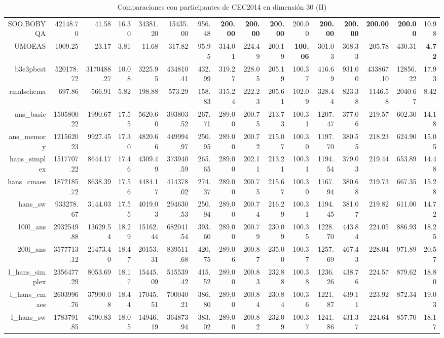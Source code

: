 \begin{table}[h!]
\begin{tabular}{rrrrrrrrrrrrrrrr}
  SOO.BOBYQA & 42148.70 & 41.58 & 16.30 & 34381.20 & 15435.00 & 956.48 & \textbf{200.00} & \textbf{200.00} & \textbf{200.00} & 200.00 & \textbf{200.00} & \textbf{200.00} & \textbf{200.00} & \textbf{200.00} & 10.98 \\ 
  UMOEAS & 1009.25 & 23.17 & 3.81 & 11.68 & 317.82 & 95.95 & 314.01 & 224.49 & 200.19 & \textbf{100.06} & 301.03 & 368.33 & 205.78 & 430.31 & \textbf{4.72} \\ 
  b3e3pbest & 520178.72 & 3170488.27 & 10.08 & 3225.95 & 434810.41 & 432.99 & 319.27 & 228.05 & 205.19 & 100.37 & 416.69 & 931.00 & 433867.10 & 12856.22 & 17.93 \\ 
  rmalschcma & 697.86 & 566.91 & 5.82 & 198.88 & 573.29 & 158.83 & 315.24 & 222.23 & 205.61 & 102.09 & 328.44 & 823.38 & 1146.58 & 2040.67 & 8.42 \\ 
  ans\_basic & 1505800.22 & 1990.67 & 17.55 & 5620.60 & 393803.52 & 267.71 & 289.00 & 200.75 & 213.73 & 100.31 & 1207.47 & 377.06 & 219.57 & 602.30 & 14.18 \\ 
  ans\_memory & 1215620.23 & 9927.45 & 17.30 & 4820.66 & 449994.97 & 250.95 & 289.00 & 200.72 & 215.07 & 100.30 & 1197.70 & 380.55 & 218.23 & 624.90 & 15.05 \\ 
  hans\_simplex & 1517707.22 & 8644.17 & 17.46 & 4309.49 & 373940.59 & 265.65 & 289.00 & 202.11 & 213.21 & 100.31 & 1194.54 & 379.03 & 219.44 & 653.89 & 14.48 \\ 
  hans\_cmaes & 1872185.72 & 8638.39 & 17.56 & 4484.17 & 414378.02 & 274.37 & 289.00 & 200.75 & 215.67 & 100.30 & 1167.94 & 380.68 & 219.73 & 667.35 & 15.28 \\ 
  hans\_sw & 933278.67 & 3144.03 & 17.55 & 4019.03 & 294630.53 & 250.94 & 289.00 & 200.74 & 216.29 & 100.31 & 1194.45 & 381.07 & 219.82 & 611.00 & 14.72 \\ 
  100l\_ans & 2932549.88 & 13629.54 & 18.29 & 15162.44 & 682041.54 & 393.60 & 289.00 & 200.79 & 230.09 & 100.35 & 1228.70 & 443.84 & 224.05 & 886.93 & 18.25 \\ 
  200l\_ans & 3577713.12 & 21473.40 & 18.47 & 20153.31 & 839511.68 & 420.75 & 289.06 & 200.87 & 235.00 & 100.37 & 1257.69 & 467.43 & 228.04 & 971.89 & 20.57 \\ 
  l\_hans\_simplex & 2356477.29 & 8053.69 & 18.17 & 15445.09 & 515539.42 & 415.52 & 289.00 & 200.83 & 232.88 & 100.38 & 1236.26 & 438.76 & 224.57 & 879.62 & 18.80 \\ 
  l\_hans\_cmaes & 2603996.76 & 37990.08 & 18.44 & 17045.51 & 700040.21 & 386.80 & 289.00 & 200.84 & 230.84 & 100.36 & 1221.87 & 439.11 & 223.92 & 872.34 & 19.03 \\ 
  l\_hans\_sw & 1783791.85 & 4590.83 & 18.05 & 14946.19 & 364873.94 & 383.02 & 289.00 & 200.82 & 232.09 & 100.37 & 1241.86 & 431.37 & 224.64 & 857.70 & 18.17 \\ 
   \hline
\end{tabular}
\endgroup
\caption{Comparaciones con participantes de CEC2014 en dimensión 30 (II)} 
\label{cec30b}
\end{table}
